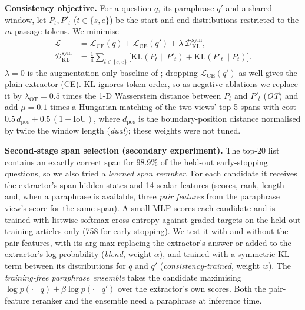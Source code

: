 \documentclass[11pt]{article}
\begin{document}
\textbf{Consistency objective.} For a question $q$, its paraphrase $q'$ and a shared window, let $P_t,P'_t$ ($t\in\{s,e\}$) be the start and end distributions restricted to the $m$ passage tokens. We minimise
\begin{equation}
\begin{split}
\mathcal{L}&=\mathcal{L}_{\mathrm{CE}}(q)+\mathcal{L}_{\mathrm{CE}}(q')+\lambda\,\mathcal{D}_{\mathrm{KL}}^{\mathrm{sym}},\\
\mathcal{D}_{\mathrm{KL}}^{\mathrm{sym}}&=\tfrac14\!\sum_{t\in\{s,e\}}\!\big[\mathrm{KL}(P_t\|P'_t)+\mathrm{KL}(P'_t\|P_t)\big].
\end{split}
\end{equation}
$\lambda=0$ is the augmentation-only baseline of \citet{gan2019improving}; dropping $\mathcal{L}_{\mathrm{CE}}(q')$ as well gives the plain extractor (CE). KL ignores token order, so as negative ablations we replace it by $\lambda_{\mathrm{OT}}=0.5$ times the 1-D Wasserstein distance between $P_t$ and $P'_t$ (\emph{OT}) and add $\mu=0.1$ times a Hungarian matching of the two views' top-5 spans with cost $0.5\,d_{\mathrm{pos}}+0.5\,(1-\mathrm{IoU})$, where $d_{\mathrm{pos}}$ is the boundary-position distance normalised by twice the window length (\emph{dual}); these weights were not tuned.

\textbf{Second-stage span selection (secondary experiment).}
The top-20 list contains an exactly correct span for 98.9\% of the held-out early-stopping questions, so we also tried a \emph{learned span reranker}. For each candidate it receives the extractor's span hidden states \citep{lee2017end} and 14 scalar features (scores, rank, length and, when a paraphrase is available, three \emph{pair features} from the paraphrase view's score for the same span). A small MLP scores each candidate and is trained with listwise softmax cross-entropy \citep{cao2007learning} against graded targets on the held-out training articles only (758 for early stopping). We test it with and without the pair features, with its arg-max replacing the extractor's answer or added to the extractor's log-probability (\emph{blend}, weight $\alpha$), and trained with a symmetric-KL term between its distributions for $q$ and $q'$ (\emph{consistency-trained}, weight $w$). The \emph{training-free paraphrase ensemble} takes the candidate maximising $\log p(\cdot\mid q)+\beta\log p(\cdot\mid q')$ over the extractor's own scores. Both the pair-feature reranker and the ensemble need a paraphrase at inference time.
\end{document}

